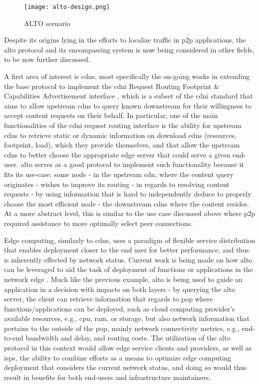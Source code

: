     \begin{figure}[H]
    \centering
    \texttt{[image: alto-design.png]}
    \caption{ALTO scenario \cite{seedorf2009}}
    \label{fig:alto-design}
    \end{figure}

    Despite its origins lying in the efforts to localize traffic in \gls{p2p} applications, the \gls{alto} protocol and its encompassing system is now being considered in other fields, to be now further discussed.

    A first area of interest is \glspl{cdn}, most specifically the on-going works in extending the base protocol to implement the \gls{cdni} Request Routing Footprint \& Capabilities Advertisement interface \cite{alto-cdni}, which is a subset of the \gls{cdni} standard \cite{cdni-problem-statement} that aims to allow upstream \glspl{cdn} to query known downstream  for their willingness to accept content requests on their behalf.
    In particular, one of the main functionalities of the \gls{cdni} request routing interface is the ability for upstream \glspl{cdn} to retrieve static or dynamic information on download \glspl{cdn} (resources, footprint, load), which they provide themselves, and that allow the upstream \glspl{cdn} to better choose the appropriate edge server that could serve a given end-user.
    \gls{alto} serves as a good protocol to implement such functionality because it fits its use-case: some node - in the upstream \gls{cdn}, where the content query originates - wishes to improve its routing - in regards to resolving content requests - by using information that is hard to independently deduce to properly choose the most efficient node - the downstream \glspl{cdn} where the content resides.
    At a more abstract level, this is similar to the use case discussed above where \gls{p2p} required assistance to more optimally select peer connections.

    Edge computing, similarly to \glspl{cdn}, uses a paradigm of flexible service distribution that enables deployment closer to the end user for better performance, and thus is inherently effected by network status.
    Current work is being made on how \gls{alto} can be leveraged to aid the task of deployment of functions or applications in the network edge \cite{alto-determining-service-edge}.
    Much like the previous example, \gls{alto} is being used to guide an application in a decision with impacts on both layers - by querying the \gls{alto} server, the client can retrieve information that regards to \gls{pop} where functions/applications can be deployed, such as cloud computing provider's available resources, e.g., \gls{cpu}, \gls{ram}, or storage, but also network information that pertains to the outside of the \gls{pop}, mainly network connectivity metrics, e.g., end-to-end bandwidth and delay, and routing costs.
    The utilization of the \gls{alto} protocol in this context would allow edge service clients and providers, as well as \glspl{isp}, the ability to combine efforts as a means to optimize edge computing deployment that considers the current network status, and doing so would thus result in benefits for both end-users and infrastructure maintainers.

